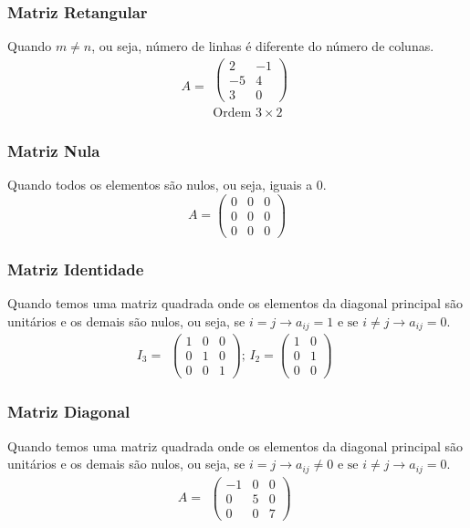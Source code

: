 \documentclass[12pt]{article}
\begin{document}
\subsubsection{Matriz Retangular}
Quando $m \neq n$, ou seja, número de linhas é diferente do número de colunas.
\noindent
\[
A = 
\begin{array}{c}
    \begin{pmatrix}
         2  & -1 \\
        -5  &  4 \\
         3  &  0 
    \end{pmatrix} \\
        \text{Ordem } 3 \times 2
\end{array}
\]

\subsubsection{Matriz Nula}
Quando todos os elementos são nulos, ou seja, iguais a 0.
\noindent
\[
A = 
    \begin{pmatrix}
        0  &  0  &  0 \\
        0  &  0  &  0 \\
        0  &  0  &  0
    \end{pmatrix}
\]

\subsubsection{Matriz Identidade}
Quando temos uma matriz quadrada onde os elementos da diagonal principal são unitários e os demais são nulos, ou seja,
se $i=j \rightarrow a_{ij} = 1 \text{ e se } i \neq j \rightarrow a_{ij} = 0$.
\noindent
\[
I_3 =
\begin{array}{c}
    \begin{pmatrix}
        1  &  0  &  0 \\
        0  &  1  &  0 \\
        0  &  0  &  1
    \end{pmatrix}
        \text{; }

I_2 =
    \begin{pmatrix}
        1  &  0 \\
        0  &  1 \\
        0  &  0
    \end{pmatrix} 
\end{array}
\]

\subsubsection{Matriz Diagonal}
Quando temos uma matriz quadrada onde os elementos da diagonal principal são unitários e os demais são nulos, ou seja,
se $i=j \rightarrow a_{ij} \neq 0 \text{ e se } i \neq j \rightarrow a_{ij} = 0$.
\noindent
\[
A =
\begin{array}{c}
    \begin{pmatrix}
        -1  &  0  &  0 \\
         0  &  5  &  0 \\
         0  &  0  &  7
    \end{pmatrix}
\end{array}
\]
\end{document}
